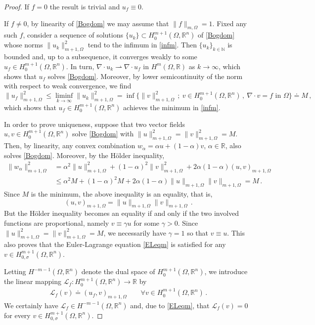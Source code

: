 \documentclass[11pt]{article}
\theoremstyle{plain}
\theoremstyle{definition}
\numberwithin{equation}{section}
\begin{document}
\begin{proof} If $f=0$ the result is trivial and $u_f \equiv 0$.\par
	If $f\neq0$, by linearity of \eqref{Bogdom} we may assume that $\|f\|_{m,\Omega}=1$. Fixed any such $f$, consider a sequence of solutions $\{u_k\}\subset H_0^{m+1}(\Omega, \mathbb{R}^{n})$
of \eqref{Bogdom} whose norms $\|u_k\|_{m+1,\Omega}^2$ tend to the infimum
	in \eqref{infm}. Then $\{u_k\}_{k \in \mathbb{N}}$ is bounded  and, up to a subsequence, it converges weakly to some
	$u_f\in H_0^{m+1}(\Omega, \mathbb{R}^{n})$. In turn,
	$\nabla\cdot u_k\rightharpoonup \nabla\cdot u_f$ in $H^m(\Omega, \mathbb{R})$ as $k\to\infty$, which shows that $u_f$ solves \eqref{Bogdom}. Moreover,
	by lower semicontinuity of the norm with respect to weak convergence, we find
	$$
	\|u_f\|_{m+1,\Omega}^2 \le \liminf_{k\to\infty}\|u_k\|_{m+1,\Omega}^2
	=\inf\Big\{\|v\|_{m+1,\Omega}^2\, ;\ v\in H^{m+1}_0(\Omega, \mathbb{R}^{n})\, ,\ \nabla\cdot v=f\text{ in }\Omega\Big\} \doteq M \, ,
	$$
	which shows that $u_f\in H_0^{m+1}(\Omega, \mathbb{R}^{n})$ achieves the minimum in \eqref{infm}.\par
	In order to prove uniqueness, suppose that two vector fields $u,v\in H^{m+1}_0(\Omega,\mathbb{R}^{n})$ solve
	\eqref{Bogdom} with $\|u\|_{m+1,\Omega}^2=\|v\|_{m+1,\Omega}^2=M$. Then, by linearity,
	any convex combination $w_\alpha=\alpha u+(1-\alpha)v$, $\alpha \in \mathbb{R}$, also solves \eqref{Bogdom}. Moreover, by the H\"older inequality,
	\begin{align*}
		\|w_\alpha\|_{m+1,\Omega}^2 & = \alpha^2\|u\|_{m+1,\Omega}^2+(1-\alpha)^2\|v\|_{m+1,\Omega}^2+2\alpha(1-\alpha)(u,v)_{m+1,\Omega}\\[6pt]
		&\le \alpha^2 M+(1-\alpha)^2M+2\alpha(1-\alpha)\|u\|_{m+1,\Omega}\|v\|_{m+1,\Omega}=M\, .
	\end{align*}
	Since $M$ is the minimum, the above inequality is an equality, that is,
	$$
	(u,v)_{m+1,\Omega}=\|u\|_{m+1,\Omega}\|v\|_{m+1,\Omega}\, .
	$$
	But the H\"older inequality becomes an equality if and only if the two involved functions are proportional, namely
	$v\equiv\gamma u$ for some $\gamma>0$. Since $\|u\|_{m+1,\Omega}^2=\|v\|_{m+1,\Omega}^2=M$, we necessarily have $\gamma=1$ so that $v\equiv u$.
	This also proves that the Euler-Lagrange equation \eqref{ELeqm} is satisfied for any $v\in H^{m+1}_{0, \sigma}(\Omega, \mathbb{R}^{n})$.\par
	Letting  $H^{-m-1}(\Omega, \mathbb{R}^{n})$ denote the dual space of $H_{0}^{m+1}(\Omega, \mathbb{R}^{n})$, we introduce the linear mapping
	$\mathcal{L}_{f} : H_{0}^{m+1}(\Omega, \mathbb{R}^{n}) \longrightarrow \mathbb{R}$ by
	$$
	\begin{aligned}
		\mathcal{L}_{f}(v) \doteq (u_f,v)_{m+1, \Omega} \qquad \forall v \in H_{0}^{m+1}(\Omega, \mathbb{R}^{n}) \, .
	\end{aligned}
	$$
	We certainly have $\mathcal{L}_{f} \in H^{-m-1}(\Omega, \mathbb{R}^{n})$ and, due to \eqref{ELeqm}, that $\mathcal{L}_{f}(v)=0$ for every $v \in H^{m+1}_{0, \sigma}(\Omega, \mathbb{R}^{n})$.
	

\end{proof}
\end{document}
